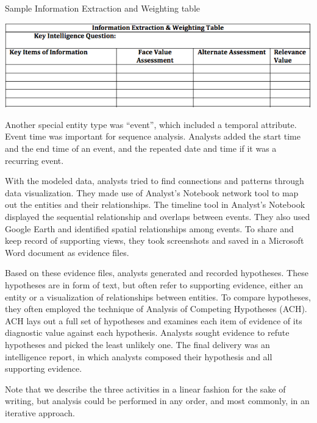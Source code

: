 \begin{table}
	\caption{Sample Information Extraction and Weighting table}
	\label{tbl:iew_table}
	\includegraphics[width=\columnwidth]{./03-System/img/IEW_table.png}
\end{table}

Another special entity type was ``event'', which included a temporal attribute. Event time was important for sequence analysis. Analysts added the start time and the end time of an event, and the repeated date and time if it was a recurring event. 

With the modeled data, analysts tried to find connections and patterns through data visualization. They made use of Analyst's Notebook network tool to map out the entities and their relationships. The timeline tool in Analyst's Notebook displayed the sequential relationship and overlaps between events. They also used Google Earth and identified spatial relationships among events.  To share and keep record of supporting views, they took screenshots and saved in a Microsoft Word document as evidence files. 

Based on these evidence files, analysts generated and recorded hypotheses. These hypotheses are in form of text, but often refer to supporting evidence, either an entity or a visualization of relationships between entities. To compare hypotheses, they often employed the technique of Analysis of Competing Hypotheses (ACH). ACH lays out a full set of hypotheses and examines each item of evidence of its diagnostic value against each hypothesis. Analysts sought evidence to refute hypotheses and picked the least unlikely one. The final delivery was an intelligence report, in which analysts composed their hypothesis and all supporting evidence.

Note that we describe the three activities in a linear fashion for the sake of writing, but analysis could be performed in any order, and most commonly, in an iterative approach.


